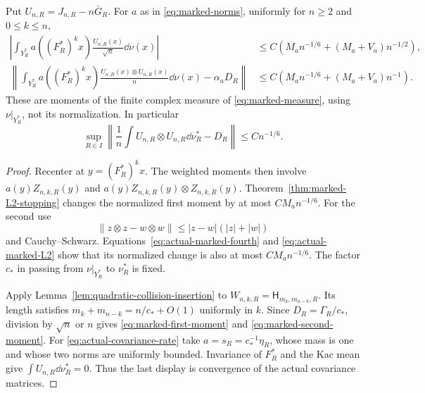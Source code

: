 \begin{theorem}
\label{thm:marked-quadratic-moments}
Put $U_{n,R}=J_{n,R}-n\bar G_R$. For $a$ as in
\eqref{eq:marked-norms}, uniformly for $n\ge2$ and $0\le k\le n$,
\begin{align}
 \left|\int_{Y_R^*}a((F_R^*)^kx)\frac{U_{n,R}(x)}{\sqrt n}\dd\nu(x)\right|
 &\le C\left(M_an^{-1/6}+(M_a+V_a)n^{-1/2}\right),
       \label{eq:marked-first-moment}\\
 \left\|\int_{Y_R^*}a((F_R^*)^kx)
       \frac{U_{n,R}(x)\otimes U_{n,R}(x)}n\dd\nu(x)-\alpha_a D_R\right\|
 &\le C\left(M_an^{-1/6}+(M_a+V_a)n^{-1}\right).
       \label{eq:marked-second-moment}
\end{align}
These are moments of the finite complex measure of
\eqref{eq:marked-measure}, using $\nu|_{Y_R^*}$, not its normalization.
In particular
\begin{equation}\label{eq:actual-covariance-rate}
 \sup_{R\in I}\left\|\frac1n\int U_{n,R}\otimes U_{n,R}\dd\nu_R^*
                                               -D_R\right\|
       \le C n^{-1/6}.
\end{equation}
\end{theorem}
\begin{proof}
Recenter at $y=(F_R^*)^kx$. The weighted moments then involve
$a(y)Z_{n,k,R}(y)$ and $a(y)Z_{n,k,R}(y)\otimes Z_{n,k,R}(y)$.
Theorem~\ref{thm:marked-L2-stopping} changes the normalized first
moment by at most $CM_an^{-1/6}$. For the second use
\[
 \|z\otimes z-w\otimes w\|\le |z-w|(|z|+|w|)
\]
and Cauchy--Schwarz. Equations~\eqref{eq:actual-marked-fourth} and
\eqref{eq:actual-marked-L2} show that its normalized change is also
at most $CM_an^{-1/6}$. The factor $c_*$ in passing from
$\nu|_{Y_R^*}$ to $\nu_R^*$ is fixed.

Apply Lemma~\ref{lem:quadratic-collision-insertion} to
$W_{n,k,R}=\mathsf H_{m_k,m_{n-k},R}$. Its length satisfies
$m_k+m_{n-k}=n/c_*+O(1)$ uniformly in $k$. Since
$D_R=\Gamma_R/c_*$, division by $\sqrt n$ or $n$ gives
\eqref{eq:marked-first-moment} and \eqref{eq:marked-second-moment}.
For \eqref{eq:actual-covariance-rate} take $a=s_R=c_*^{-1}\eta_R$,
whose mass is one and whose two norms are uniformly bounded. Invariance
of $F_R^*$ and the Kac mean give $\int U_{n,R}\dd\nu_R^*=0$.
Thus the last display is convergence of the actual covariance matrices.
\end{proof}

